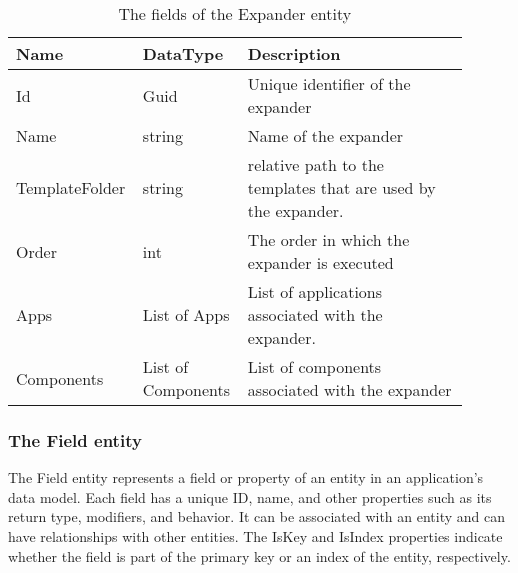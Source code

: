 \begin{table}[H]
\small
\begin{tabular}{ p{0.20\linewidth} p{0.22\linewidth} p{0.48\linewidth} }
\hline
\textbf{Name} & \textbf{DataType} & \textbf{Description} \\
\hline
Id & Guid & Unique identifier of the expander \\
Name & string & Name of the expander \\
TemplateFolder & string & relative path to the templates that are used by the expander. \\
Order & int & The order in which the expander is executed \\
Apps & List of Apps & List of applications associated with the expander. \\
Components & List of Components & List of components associated with the expander \\
\hline
\end{tabular}
\caption{The fields of the Expander entity}
\label{table:expander_entity}
\end{table}

\subsubsection{The Field entity}

The Field entity represents a field or property of an entity in an application's data
model. Each field has a unique ID, name, and other properties such as its return type,
modifiers, and behavior. It can be associated with an entity and can have relationships
with other entities. The IsKey and IsIndex properties indicate whether the field is part
of the primary key or an index of the entity, respectively.

